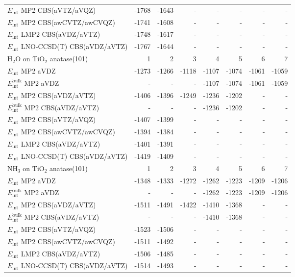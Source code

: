 \begin{longtable}{lrrrrrrr}
$E_\text{int}$ MP2 CBS(aVTZ/aVQZ) & -1768 & -1643 & - & - & - & - & - \\
$E_\text{int}$ MP2 CBS(awCVTZ/awCVQZ) & -1741 & -1608 & - & - & - & - & - \\
$E_\text{int}$ LMP2 CBS(aVDZ/aVTZ) & -1748 & -1617 & - & - & - & - & - \\
$E_\text{int}$ LNO-CCSD(T) CBS(aVDZ/aVTZ) & -1767 & -1644 & - & - & - & - & - \\
\toprule
H$_2$O on TiO$_2$ anatase(101) & 1 & 2 & 3 & 4 & 5 & 6 & 7 \\ 
\midrule
$E_\text{int}$ MP2 aVDZ & -1273 & -1266 & -1118 & -1107 & -1074 & -1061 & -1059 \\
$E_\text{int}^\text{bulk}$ MP2 aVDZ & - & - & - & -1107 & -1074 & -1061 & -1059 \\
$E_\text{int}$ MP2 CBS(aVDZ/aVTZ) & -1406 & -1396 & -1249 & -1236 & -1202 & - & - \\
$E_\text{int}^\text{bulk}$ MP2 CBS(aVDZ/aVTZ) & - & - & - & -1236 & -1202 & - & - \\
$E_\text{int}$ MP2 CBS(aVTZ/aVQZ) & -1407 & -1399 & - & - & - & - & - \\
$E_\text{int}$ MP2 CBS(awCVTZ/awCVQZ) & -1394 & -1384 & - & - & - & - & - \\
$E_\text{int}$ LMP2 CBS(aVDZ/aVTZ) & -1401 & -1391 & - & - & - & - & - \\
$E_\text{int}$ LNO-CCSD(T) CBS(aVDZ/aVTZ) & -1419 & -1409 & - & - & - & - & - \\
\toprule
NH$_3$ on TiO$_2$ anatase(101) & 1 & 2 & 3 & 4 & 5 & 6 & 7 \\ 
\midrule
$E_\text{int}$ MP2 aVDZ & -1348 & -1333 & -1272 & -1262 & -1223 & -1209 & -1206 \\
$E_\text{int}^\text{bulk}$ MP2 aVDZ & - & - & - & -1262 & -1223 & -1209 & -1206 \\
$E_\text{int}$ MP2 CBS(aVDZ/aVTZ) & -1511 & -1491 & -1422 & -1410 & -1368 & - & - \\
$E_\text{int}^\text{bulk}$ MP2 CBS(aVDZ/aVTZ) & - & - & - & -1410 & -1368 & - & - \\
$E_\text{int}$ MP2 CBS(aVTZ/aVQZ) & -1523 & -1506 & - & - & - & - & - \\
$E_\text{int}$ MP2 CBS(awCVTZ/awCVQZ) & -1511 & -1492 & - & - & - & - & - \\
$E_\text{int}$ LMP2 CBS(aVDZ/aVTZ) & -1506 & -1485 & - & - & - & - & - \\
$E_\text{int}$ LNO-CCSD(T) CBS(aVDZ/aVTZ) & -1514 & -1493 & - & - & - & - & - \\
\end{longtable}